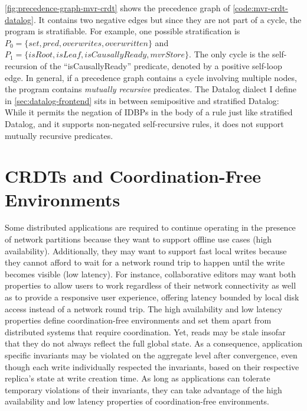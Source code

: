 \ref{fig:precedence-graph-mvr-crdt} shows the precedence graph
of \ref{code:mvr-crdt-datalog}.
It contains two negative edges but since they are not part of a cycle,
the program is stratifiable.
For example, one possible stratification is
\(P_0 = \{\mathit{set}, \mathit{pred}, \mathit{overwrites}, \mathit{overwritten}\}\)
and
\(P_1 = \{\mathit{isRoot}, \mathit{isLeaf}, \mathit{isCausallyReady}, \mathit{mvrStore}\}\).
The only cycle is the self-recursion of the ``isCausallyReady'' predicate,
denoted by a positive self-loop edge.
In general, if a precedence graph contains a cycle involving multiple nodes,
the program contains \emph{mutually recursive} predicates.
The Datalog dialect I define in \ref{sec:datalog-frontend} sits in between
semipositive and stratified Datalog:
While it permits the negation of \acp{IDBP} in the body of a rule just like
stratified Datalog, and it supports non-negated self-recursive rules,
it does not support mutually recursive predicates.

\section{\acsp{CRDT} and Coordination-Free Environments}\label{sec:crdt-coordination-free}

Some distributed applications are required to continue operating in the presence of
network partitions because they want to support offline use cases (high availability).
Additionally, they may want to support fast local writes because they cannot afford
to wait for a network round trip to happen until the write becomes
visible (low latency).
For instance, collaborative editors may want both properties to allow users
to work regardless of their network connectivity as well as to provide a
responsive user experience, offering latency bounded by local disk access instead
of a network round trip.
The high availability and low latency properties define coordination-free
environments and set them apart from distributed systems that require coordination.
Yet, reads may be stale insofar that they do not always reflect the full global state.
As a consequence, application specific invariants may be violated on the aggregate
level after convergence, even though each write individually respected the invariants,
based on their respective replica's state at write creation time.
As long as applications can tolerate temporary violations of their invariants,
they can take advantage of the high availability and low latency properties
of coordination-free environments.

